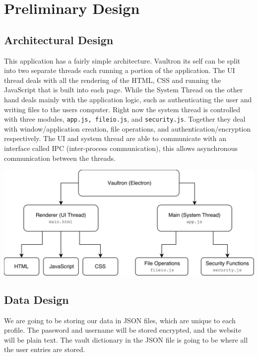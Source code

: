 \documentclass[11pt]{report}
\begin{document}
\clearpage
\tableofcontents{}


\chapter{Preliminary Design}

\section{Architectural Design}
This application has a fairly simple architecture. Vaultron its self can be split into two separate threads each running a portion of the application. The UI thread deals with all the rendering of the HTML, CSS and running the JavaScript that is built into each page. While the System Thread on the other hand deals mainly with the application logic, such as authenticating the user and writing files to the users computer. Right now the system thread is controlled with three modules, \texttt{app.js, fileio.js}, and \texttt{security.js}. Together they deal with window/application creation, file operations, and authentication/encryption respectively. The UI and system thread are able to communicate with an interface called IPC (inter-process communication), this allows asynchronous communication between the threads.

\vspace{4mm}
\includegraphics[scale=0.039]{arch_diagram.png}

\clearpage

\section{Data Design}
We are going to be storing our data in JSON files, which are unique to each profile. The password and username will be stored encrypted, and the website will be plain text. The vault dictionary in the JSON file is going to be where all the user entries are stored.
\end{document}

